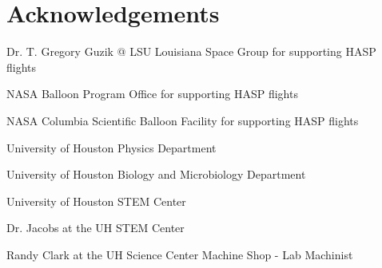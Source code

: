 
\section{Acknowledgements}
\label{Acknowledgements}
Dr. T. Gregory Guzik @ LSU %
Louisiana Space Group for supporting HASP flights

NASA Balloon Program Office for supporting HASP flights

NASA Columbia Scientific Balloon Facility for supporting HASP flights

University of Houston Physics Department

University of Houston Biology and Microbiology Department

University of Houston STEM Center

Dr. Jacobs at the UH STEM Center

Randy Clark at the UH Science Center Machine Shop - Lab Machinist


